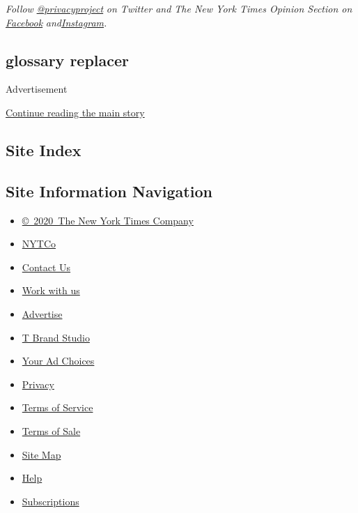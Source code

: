\emph{Follow}
\href{https://twitter.com/privacyproject}{\emph{@privacyproject}}
\emph{on Twitter and The New York Times Opinion Section on}
\href{https://www.facebook.com/nytopinion}{\emph{Facebook}}
\emph{and}\href{https://www.instagram.com/nytopinion/}{\emph{Instagram}}\emph{.}

\hypertarget{glossary-replacer}{%
\subsection{glossary replacer}\label{glossary-replacer}}

Advertisement

\protect\hyperlink{after-bottom}{Continue reading the main story}

\hypertarget{site-index}{%
\subsection{Site Index}\label{site-index}}

\hypertarget{site-information-navigation}{%
\subsection{Site Information
Navigation}\label{site-information-navigation}}

\begin{itemize}
\tightlist
\item
  \href{https://help.nytimes.com/hc/en-us/articles/115014792127-Copyright-notice}{©~2020~The
  New York Times Company}
\end{itemize}

\begin{itemize}
\tightlist
\item
  \href{https://www.nytco.com/}{NYTCo}
\item
  \href{https://help.nytimes.com/hc/en-us/articles/115015385887-Contact-Us}{Contact
  Us}
\item
  \href{https://www.nytco.com/careers/}{Work with us}
\item
  \href{https://nytmediakit.com/}{Advertise}
\item
  \href{http://www.tbrandstudio.com/}{T Brand Studio}
\item
  \href{https://www.nytimes.com/privacy/cookie-policy\#how-do-i-manage-trackers}{Your
  Ad Choices}
\item
  \href{https://www.nytimes.com/privacy}{Privacy}
\item
  \href{https://help.nytimes.com/hc/en-us/articles/115014893428-Terms-of-service}{Terms
  of Service}
\item
  \href{https://help.nytimes.com/hc/en-us/articles/115014893968-Terms-of-sale}{Terms
  of Sale}
\item
  \href{https://spiderbites.nytimes.com}{Site Map}
\item
  \href{https://help.nytimes.com/hc/en-us}{Help}
\item
  \href{https://www.nytimes.com/subscription?campaignId=37WXW}{Subscriptions}
\end{itemize}
